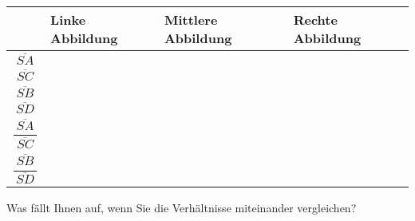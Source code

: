 \documentclass[11pt, a4paper, oneside]{article}
\begin{document}
	{
	\renewcommand{\arraystretch}{2}
	\setlength\tabcolsep{.5cm}
	\begin{tabularx}{\textwidth}{c|X|X|X}
		& Linke Abbildung & Mittlere Abbildung & Rechte Abbildung\\
		\hline
		$\overline{SA}$ &&&\\
		\hline
		$\overline{SC}$ &&&\\
		\hline
		$\overline{SB}$ &&&\\
		\hline
		$\overline{SD}$ &&&\\
		\hline
		$\dfrac{\ \overline{SA}\ }{\overline{SC}}$ &&&\\
		\hline
		$\dfrac{\ \overline{SB}\ }{\overline{SD}}$ &&&\\
	\end{tabularx}
	}

	Was fällt Ihnen auf, wenn Sie die Verhältnisse miteinander vergleichen?
	
	\lines[3cm]
	
	\pagebreak
	
	\boxarea[22cm]
	
\end{document}
